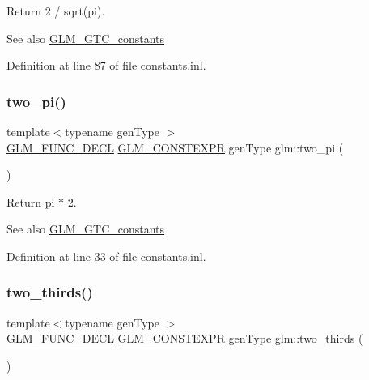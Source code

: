 Return 2 / sqrt(pi). \begin{DoxySeeAlso}{See also}
\mbox{\hyperlink{group__gtc__constants}{G\+L\+M\+\_\+\+G\+T\+C\+\_\+constants}} 
\end{DoxySeeAlso}


Definition at line 87 of file constants.\+inl.

\mbox{\label{group__gtc__constants_gaa5276a4617566abcfe49286f40e3a256}} 
\subsubsection{\texorpdfstring{two\_pi()}{two\_pi()}}
{\footnotesize\ttfamily template$<$typename gen\+Type $>$ \\
\mbox{\hyperlink{setup_8hpp_ab2d052de21a70539923e9bcbf6e83a51}{G\+L\+M\+\_\+\+F\+U\+N\+C\+\_\+\+D\+E\+CL}} \mbox{\hyperlink{setup_8hpp_a08b807947b47031d3a511f03f89645ad}{G\+L\+M\+\_\+\+C\+O\+N\+S\+T\+E\+X\+PR}} gen\+Type glm\+::two\+\_\+pi (\begin{DoxyParamCaption}{ }\end{DoxyParamCaption})}

Return pi $\ast$ 2. \begin{DoxySeeAlso}{See also}
\mbox{\hyperlink{group__gtc__constants}{G\+L\+M\+\_\+\+G\+T\+C\+\_\+constants}} 
\end{DoxySeeAlso}


Definition at line 33 of file constants.\+inl.

\mbox{\label{group__gtc__constants_ga9b4d2f4322edcf63a6737b92a29dd1f5}} 
\subsubsection{\texorpdfstring{two\_thirds()}{two\_thirds()}}
{\footnotesize\ttfamily template$<$typename gen\+Type $>$ \\
\mbox{\hyperlink{setup_8hpp_ab2d052de21a70539923e9bcbf6e83a51}{G\+L\+M\+\_\+\+F\+U\+N\+C\+\_\+\+D\+E\+CL}} \mbox{\hyperlink{setup_8hpp_a08b807947b47031d3a511f03f89645ad}{G\+L\+M\+\_\+\+C\+O\+N\+S\+T\+E\+X\+PR}} gen\+Type glm\+::two\+\_\+thirds (\begin{DoxyParamCaption}{ }\end{DoxyParamCaption})}

